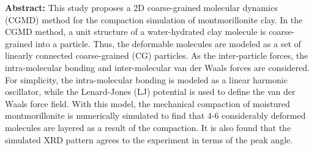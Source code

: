﻿\documentclass[11pt,a4j]{jarticle}
\begin{document}
\begin{center}
\begin{minipage}{0.9\hsize}
{\bf Abstract:}
This study proposes a 2D coarse-grained molecular dynamics (CGMD) method for the compaction simulation of montmorillonite clay.
In the CGMD method, a unit structure of a water-hydrated clay molecule is coarse-grained into a particle.
Thus, the deformable molecules are modeled as a set of linearly connected coarse-grained (CG) particles.
As the inter-particle forces, the intra-molecular bonding and inter-molecular van der Waals forces are considered.
For simplicity, the intra-molecular bonding is modeled as a linear harmonic oscillator, while the Lenard-Jones (LJ) potential 
is used to define the van der Waals force field. 
With this model, the mechanical compaction of moistured montmorillonite is numerically simulated to find 
that 4-6 considerably deformed molecules are layered as a result of the compaction.
It is also found that the simulated XRD pattern agrees to the experiment in terms of the peak angle. 
\end{minipage}
\end{center}
\end{document}
